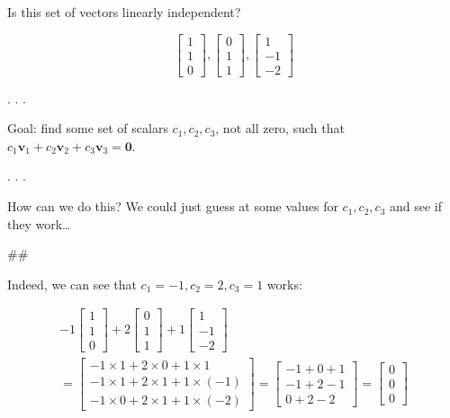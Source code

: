 \documentclass[
  letterpaper,
  DIV=11,
  numbers=noendperiod]{scrartcl}
\begin{document}
Is this set of vectors linearly independent?

\[
 \left[\begin{array}{l}1 \\ 1 \\ 0\end{array}\right],\left[\begin{array}{l}0 \\ 1 \\ 1\end{array}\right],\left[\begin{array}{r}1 \\ -1 \\ -2\end{array}\right]
\]

. . .

Goal: find some set of scalars \(c_{1}, c_{2}, c_{3}\), not all zero,
such that
\(c_{1} \mathbf{v}_{1}+c_{2} \mathbf{v}_{2}+c_{3} \mathbf{v}_{3}=\mathbf{0}\).

. . .

How can we do this? We could just guess at some values for
\(c_1, c_2, c_3\) and see if they work\ldots{}

\#\#

Indeed, we can see that \(c_1 = -1, c_2 = 2, c_3 = 1\) works:

\[
\begin{gathered}
-1 \left[\begin{array}{l}1 \\ 1 \\ 0\end{array}\right]
+ 2 \left[\begin{array}{l}0 \\ 1 \\ 1\end{array}\right]
+ 1 \left[\begin{array}{r}1 \\ -1 \\ -2\end{array}\right] \\
=
\left[\begin{array}{l}
-1 \times 1 + 2 \times 0 + 1 \times 1 \\
-1 \times 1 + 2 \times 1 + 1 \times (-1) \\
-1 \times 0 + 2 \times 1 + 1 \times (-2)
\end{array}\right]
=
\left[\begin{array}{l}
-1 + 0 + 1 \\
-1 + 2 - 1 \\
0 + 2 - 2
\end{array}\right]
=
\left[\begin{array}{l}
0 \\
0 \\
0
\end{array}\right]
\end{gathered}
\]
\end{document}
